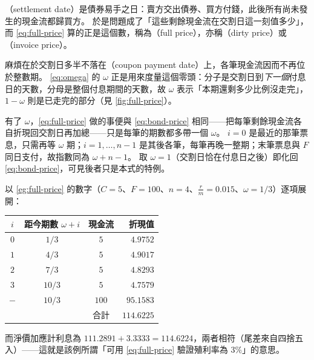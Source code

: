 \suppstart
\begin{remark}
	（settlement date）是債券易手之日：賣方交出債券、買方付錢，此後所有尚未發生的現金流都歸買方。
	於是問題成了「這些剩餘現金流在交割日這一刻值多少」，而 \eqref{eq:full-price} 算的正是這個數，稱為（full price），亦稱（dirty price）或（invoice price）。

	麻煩在於交割日多半不落在（coupon payment date）上，各筆現金流因而不再位於整數期。
	\eqref{eq:omega} 的 $\omega$ 正是用來度量這個零頭：分子是交割日到\emph{下一個}付息日的天數，分母是整個付息期間的天數，故 $\omega$ 表示「本期還剩多少比例沒走完」，$1-\omega$ 則是已走完的部分（見 \autoref{fig:full-price}）。

	有了 $\omega$，\eqref{eq:full-price} 做的事便與 \eqref{eq:bond-price} 相同——把每筆剩餘現金流各自折現回交割日再加總——只是每筆的期數都多帶一個 $\omega$。
	$i = 0$ 是最近的那筆票息，只需再等 $\omega$ 期；$i = 1, \ldots, n-1$ 是其後各筆，每筆再晚一整期；末筆票息與 $F$ 同日支付，故指數同為 $\omega+n-1$。
	取 $\omega = 1$（交割日恰在付息日之後）即化回 \eqref{eq:bond-price}，可見後者只是本式的特例。

	以 \autoref{eg:full-price} 的數字（$C = 5$、$F = 100$、$n = 4$、$\frac{r}{m} = 0.015$、$\omega = 1/3$）逐項展開：
	\begin{center}
		\small
		\begin{tabular}{@{}c c c r@{}}
			\toprule
			$i$ & 距今期數 $\omega+i$ & 現金流 & 折現值              \\
			\midrule
			$0$ & $1/3$               & $5$    & $4.9752$            \\
			$1$ & $4/3$               & $5$    & $4.9017$            \\
			$2$ & $7/3$               & $5$    & $4.8293$            \\
			$3$ & $10/3$              & $5$    & $4.7579$            \\
			$-$ & $10/3$              & $100$  & $95.1583$           \\
			\midrule
			    &                     & 合計   & $\mathbf{114.6225}$ \\
			\bottomrule
		\end{tabular}
	\end{center}
	而淨價加應計利息為 $111.2891 + 3.3333 = 114.6224$，兩者相符（尾差來自四捨五入）——這就是該例所謂「可用 \eqref{eq:full-price} 驗證殖利率為 $3\%$」的意思。
\end{remark}
\suppend

